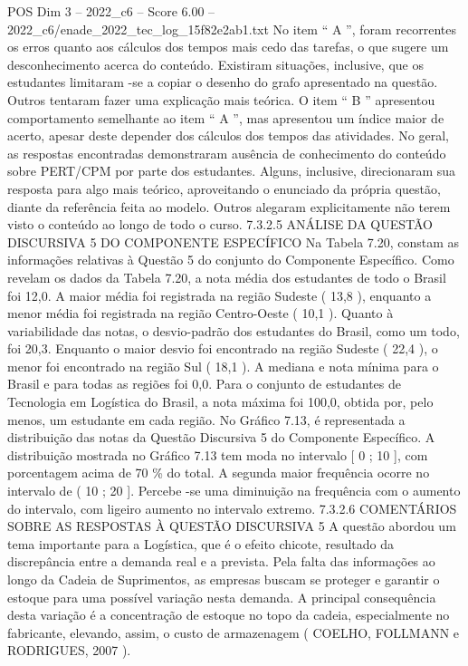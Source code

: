 \begin{textsample}{POS Dim 3 – 2022\_c6 – Score 6.00 – 2022\_c6/enade\_2022\_tec\_log\_15f82e2ab1.txt}
No item “ A ”, foram recorrentes os erros quanto aos cálculos dos tempos mais cedo das tarefas, o que sugere um desconhecimento acerca do conteúdo.
Existiram situações, inclusive, que os estudantes limitaram -se a copiar o desenho do grafo apresentado na questão.
Outros tentaram fazer uma explicação mais teórica.
O item “ B ” apresentou comportamento semelhante ao item “ A ”, mas apresentou um índice maior de acerto, apesar deste depender dos cálculos dos tempos das atividades.
No geral, as respostas encontradas demonstraram ausência de conhecimento do conteúdo sobre PERT/CPM por parte dos estudantes.
Alguns, inclusive, direcionaram sua resposta para algo mais teórico, aproveitando o enunciado da própria questão, diante da referência feita ao modelo.
Outros alegaram explicitamente não terem visto o conteúdo ao longo de todo o curso. 7.3.2.5 ANÁLISE DA QUESTÃO DISCURSIVA 5 DO COMPONENTE ESPECÍFICO Na Tabela 7.20, constam as informações relativas à Questão 5 do conjunto do Componente Específico.
Como revelam os dados da Tabela 7.20, a nota média dos estudantes de todo o Brasil foi 12,0.
A maior média foi registrada na região Sudeste ( 13,8 ), enquanto a menor média foi registrada na região Centro-Oeste ( 10,1 ).
Quanto à variabilidade das notas, o desvio-padrão dos estudantes do Brasil, como um todo, foi 20,3.
Enquanto o maior desvio foi encontrado na região Sudeste ( 22,4 ), o menor foi encontrado na região Sul ( 18,1 ).
A mediana e nota mínima para o Brasil e para todas as regiões foi 0,0.
Para o conjunto de estudantes de Tecnologia em Logística do Brasil, a nota máxima foi 100,0, obtida por, pelo menos, um estudante em cada região.
No Gráfico 7.13, é representada a distribuição das notas da Questão Discursiva 5 do Componente Específico.
A distribuição mostrada no Gráfico 7.13 tem moda no intervalo [ 0 ; 10 ], com porcentagem acima de 70 \% do total.
A segunda maior frequência ocorre no intervalo de ( 10 ; 20 ].
Percebe -se uma diminuição na frequência com o aumento do intervalo, com ligeiro aumento no intervalo extremo. 7.3.2.6 COMENTÁRIOS SOBRE AS RESPOSTAS À QUESTÃO DISCURSIVA 5 A questão abordou um tema importante para a Logística, que é o efeito chicote, resultado da discrepância entre a demanda real e a prevista.
Pela falta das informações ao longo da Cadeia de Suprimentos, as empresas buscam se proteger e garantir o estoque para uma possível variação nesta demanda.
A principal consequência desta variação é a concentração de estoque no topo da cadeia, especialmente no fabricante, elevando, assim, o custo de armazenagem ( COELHO, FOLLMANN e RODRIGUES, 2007 ).

\end{textsample}
